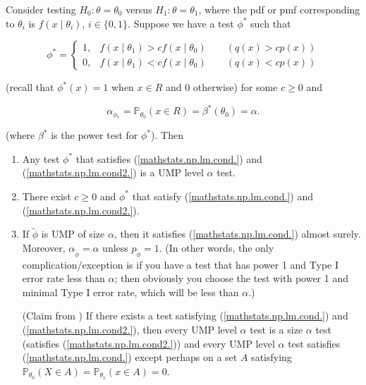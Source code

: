 \begin{lemma}



Consider testing \(H_0: \theta = \theta_0\) versus \(H_1: \theta = \theta_1\), where the pdf or pmf corresponding to \(\theta_i\) is \(f(x \mid \theta_i)\), \(i \in \{0,1\}\). Suppose we have a test \(\phi^*\) such that 

\begin{equation}\label{mathstats.np.lm.cond.}
\phi^* = \begin{cases}
1, & f(x \mid \theta_1) > c f(x \mid \theta_0) \qquad (q(x) > c p(x)) \\
0, & f(x \mid \theta_1) < c f(x \mid \theta_0)  \qquad (q(x) < c p(x))
\end{cases}
\end{equation}

(recall that \(\phi^*(x) = 1\) when \(x \in R\) and 0 otherwise) for some \(c \geq 0\) and 

\begin{equation}\label{mathstats.np.lm.cond2.}
\alpha_{\phi_*} = \mathbb{P}_{\theta_0}(x \in R) = \beta^*(\theta_0) = \alpha.
\end{equation}

(where \(\beta^*\) is the power test for \(\phi^*\)). Then

\begin{enumerate}

\item Any test \(\phi^*\) that satisfies (\ref{mathstats.np.lm.cond.}) and (\ref{mathstats.np.lm.cond2.}) is a UMP level \(\alpha\) test.

\item

There exist \(c \geq 0\) and \(\phi^*\) that satisfy (\ref{mathstats.np.lm.cond.}) and (\ref{mathstats.np.lm.cond2.}).

\item

If \(\tilde{\phi}\) is UMP of size \(\alpha\), then it satisfies (\ref{mathstats.np.lm.cond.}) almost surely. Moreover, \(\alpha_{\tilde{\phi}} = \alpha\) unless \(p_{\tilde{\phi}} = 1\). (In other words, the only complication/exception is if you have a test that has power 1 and Type I error rate less than \(\alpha\); then obviously you choose the test with power 1 and minimal Type I error rate, which will be less than \(\alpha\).)

(Claim from \citet{CaseBerg:01}) If there exists a test satisfying (\ref{mathstats.np.lm.cond.}) and (\ref{mathstats.np.lm.cond2.}), then every UMP level \(\alpha\) test is a size \(\alpha\) test (satisfies (\ref{mathstats.np.lm.cond2.})) and every UMP level \(\alpha\) test satisfies (\ref{mathstats.np.lm.cond.}) except perhaps on a set \(A\) satisfying \(\mathbb{P}_{\theta_0}(X \in A) = \mathbb{P}_{\theta_1} (x \in A) = 0\).

\end{enumerate}

\end{lemma}

